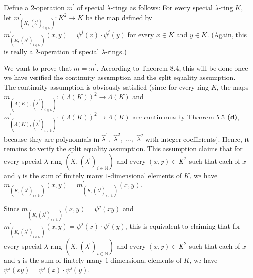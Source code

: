 \documentclass[numbers=enddot,12pt,final,onecolumn,notitlepage]{scrartcl}%
\begin{document}
Define a $2$-operation $m^{\prime}$ of special $\lambda$-rings as follows: For
every special $\lambda$-ring $K$, let $m_{\left(  K,\left(  \lambda
^{i}\right)  _{i\in\mathbb{N}}\right)  }^{\prime}:K^{2}\rightarrow K$ be the
map defined by $m_{\left(  K,\left(  \lambda^{i}\right)  _{i\in\mathbb{N}%
}\right)  }^{\prime}\left(  x,y\right)  =\psi^{j}\left(  x\right)  \cdot
\psi^{j}\left(  y\right)  $ for every $x\in K$ and $y\in K$. (Again, this is
really a $2$-operation of special $\lambda$-rings.)

We want to prove that $m=m^{\prime}$. According to Theorem 8.4, this will be
done once we have verified the continuity assumption and the split equality
assumption. The continuity assumption is obviously satisfied (since for every
ring $K$, the maps $m_{\left(  \Lambda\left(  K\right)  ,\left(
\widehat{\lambda}^{i}\right)  _{i\in\mathbb{N}}\right)  }:\left(
\Lambda\left(  K\right)  \right)  ^{2}\rightarrow\Lambda\left(  K\right)  $
and $m_{\left(  \Lambda\left(  K\right)  ,\left(  \widehat{\lambda}%
^{i}\right)  _{i\in\mathbb{N}}\right)  }^{\prime}:\left(  \Lambda\left(
K\right)  \right)  ^{2}\rightarrow\Lambda\left(  K\right)  $ are continuous by
Theorem 5.5 \textbf{(d)}, because they are polynomials in $\widehat{\lambda
}^{1},$ $\widehat{\lambda}^{2},$ $...,$ $\widehat{\lambda}^{j}$ with integer
coefficients). Hence, it remains to verify the split equality assumption. This
assumption claims that for every special $\lambda$-ring $\left(  K,\left(
\lambda^{i}\right)  _{i\in\mathbb{N}}\right)  $ and every $\left(  x,y\right)
\in K^{2}$ such that each of $x$ and $y$ is the sum of finitely many
$1$-dimensional elements of $K$, we have $m_{\left(  K,\left(  \lambda
^{i}\right)  _{i\in\mathbb{N}}\right)  }\left(  x,y\right)  =m_{\left(
K,\left(  \lambda^{i}\right)  _{i\in\mathbb{N}}\right)  }^{\prime}\left(
x,y\right)  $.

Since $m_{\left(  K,\left(  \lambda^{i}\right)  _{i\in\mathbb{N}}\right)
}\left(  x,y\right)  =\psi^{j}\left(  xy\right)  $ and $m_{\left(  K,\left(
\lambda^{i}\right)  _{i\in\mathbb{N}}\right)  }^{\prime}\left(  x,y\right)
=\psi^{j}\left(  x\right)  \cdot\psi^{j}\left(  y\right)  $, this is
equivalent to claiming that for every special $\lambda$-ring $\left(
K,\left(  \lambda^{i}\right)  _{i\in\mathbb{N}}\right)  $ and every $\left(
x,y\right)  \in K^{2}$ such that each of $x$ and $y$ is the sum of finitely
many $1$-dimensional elements of $K$, we have $\psi^{j}\left(  xy\right)
=\psi^{j}\left(  x\right)  \cdot\psi^{j}\left(  y\right)  $.
\end{document}
